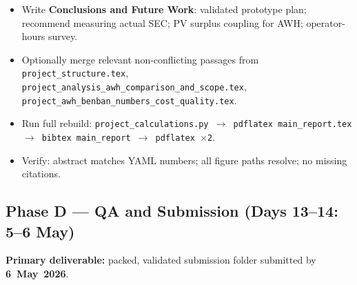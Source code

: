 \documentclass[11pt,a4paper]{article}
\begin{document}
\begin{description}[style=nextline,leftmargin=2cm,font=\normalfont\bfseries]
  \item[Day~12 \textnormal{(Mon 4 May --- Full Draft Deadline)}]
  \begin{itemize}[nosep]
    \item Write \textbf{Conclusions and Future Work}: validated prototype plan; recommend measuring actual SEC; PV surplus coupling for AWH; operator-hours survey.
    \item Optionally merge relevant non-conflicting passages from \texttt{project\_structure.tex}, \texttt{project\_analysis\_awh\_comparison\_and\_scope.tex}, \texttt{project\_awh\_benban\_numbers\_cost\_quality.tex}.
    \item Run full rebuild: \texttt{project\_calculations.py $\rightarrow$ pdflatex main\_report.tex $\rightarrow$ bibtex main\_report $\rightarrow$ pdflatex $\times$2}.
    \item Verify: abstract matches YAML numbers; all figure paths resolve; no missing citations.
  \end{itemize}
\end{description}

\subsection*{Phase D --- QA and Submission (Days 13--14: 5--6 May)}
\textbf{Primary deliverable:} packed, validated submission folder submitted by \textbf{6~May~2026}.
\end{document}
